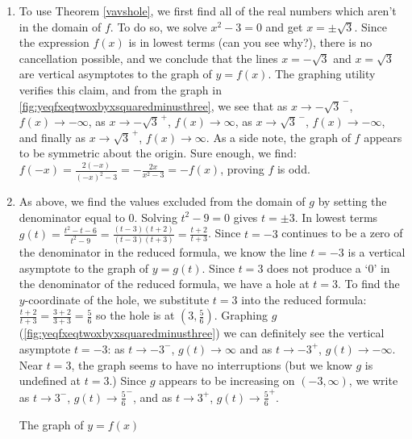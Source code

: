 \begin{ex}
\begin{ex}
\begin{enumerate}
\item  To use Theorem \ref{vavshole}, we first find all of the real numbers which aren't in the domain of $f$.  To do so, we solve $x^2 - 3 = 0$ and get $x = \pm \sqrt{3}$.  Since the expression $f(x)$ is in lowest terms (can you see why?), there is no cancellation possible, and we conclude that the lines $x = -\sqrt{3}$ and $x=\sqrt{3}$ are vertical asymptotes to the graph of $y=f(x)$.  The  graphing utility verifies this claim, and from the graph in \autoref{fig:yeqfxeqtwoxbyxsquaredminusthree}, we see that as $x \rightarrow -\sqrt{3}^{\, -}$, $f(x) \rightarrow -\infty$, as $x\rightarrow -\sqrt{3}^{\, +}$, $f(x) \rightarrow \infty$, as $x \rightarrow \sqrt{3}^{\, -}$, $f(x) \rightarrow -\infty$, and finally as $x\rightarrow \sqrt{3}^{\, +}$, $f(x) \rightarrow \infty$.  As a side note, the graph of $f$ appears to be symmetric about the origin.  Sure enough, we find: $f(-x) = \frac{2(-x)}{(-x)^2-3} = -\frac{2x}{x^2-3} = -f(x)$, proving $f$ is odd.

\item  As above, we find the values excluded from the domain of $g$ by setting the denominator equal to $0$.  Solving $t^2 - 9 = 0$ gives $t = \pm 3$.  In lowest terms $g(t) = \frac{t^2-t-6}{t^2-9} = \frac{(t-3)(t+2)}{(t-3)(t+3)} = \frac{t+2}{t+3}$.  Since $t=-3$ continues to be a zero of the denominator in the reduced formula, we know the line $t=-3$ is a vertical asymptote to the graph of $y=g(t)$.  Since $t=3$  does not produce a `$0$' in the denominator of the reduced formula,  we have a hole at $t=3$.  To find the $y$-coordinate of the hole, we substitute $t=3$ into the reduced formula: $\frac{t+2}{t+3} = \frac{3+2}{3+3} = \frac{5}{6}$  so  the hole is at $\left(3, \frac{5}{6}\right)$. Graphing $g$ (\autoref{fig:yeqfxeqtwoxbyxsquaredminusthree}) we can definitely see the vertical asymptote $t=-3$:  as  $t \rightarrow -3^{-}$, $g(t) \rightarrow \infty$ and as $t \rightarrow -3^{+}$, $g(t) \rightarrow -\infty$.  Near $t=3$, the graph seems to have no interruptions (but we know $g$ is undefined at $t=3$.) Since $g$ appears to be increasing on $(-3, \infty)$,  we write as  $t\rightarrow 3^{-}$, $g(t) \rightarrow \frac{5}{6}^{-}$, and as $t \rightarrow 3^{+}$, $g(t) \rightarrow \frac{5}{6}^{+}$.

\begin{mfigure}
  

\caption{The graph of $y=f(x)$}
\label{fig:yeqfxeqtwoxbyxsquaredminusthree}
\end{mfigure}


\end{enumerate}
\end{ex}
\end{ex}
